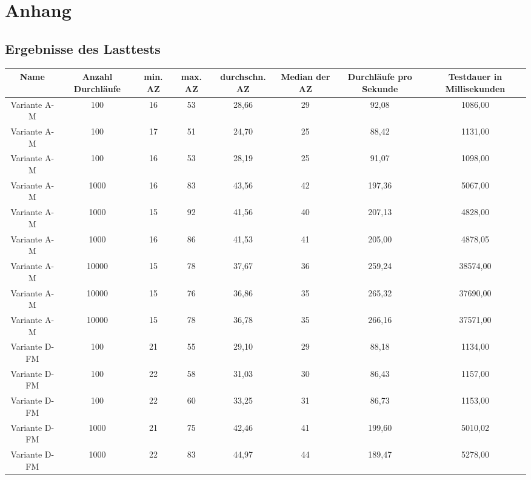 
\chapter{Anhang}

\section{Ergebnisse des Lasttests}


\begin{landscape}
\begin{table}[h!]
	\centering
	\small
	\begin{tabular}{ |c|c|c|c|c|c|c|c|} 
		\hline
		Name & Anzahl Durchläufe & min. AZ & max. AZ & durchschn. AZ & Median der AZ & Durchläufe pro Sekunde & Testdauer in Millisekunden \\ 
		\hline
		Variante A-M & 100 & 16 & 53 & 28,66 & 29 & 92,08 & 1086,00 \\
		\hline
		Variante A-M & 100 & 17 & 51 & 24,70 & 25 & 88,42 & 1131,00 \\
		\hline
		Variante A-M & 100 & 16 & 53 & 28,19 & 25 & 91,07 & 1098,00 \\
		\hline
		Variante A-M & 1000 & 16 & 83 & 43,56 & 42 & 197,36 & 5067,00 \\
		\hline
		Variante A-M & 1000 & 15 & 92 & 41,56 & 40 & 207,13 & 4828,00 \\
		\hline
		Variante A-M & 1000 & 16 & 86 & 41,53 & 41 & 205,00 & 4878,05 \\
		\hline
		Variante A-M & 10000 & 15 & 78 & 37,67 & 36 & 259,24 & 38574,00 \\
		\hline
		Variante A-M & 10000 & 15 & 76 & 36,86 & 35 & 265,32 & 37690,00 \\
		\hline
		Variante A-M & 10000 & 15 & 78 & 36,78 & 35 & 266,16 & 37571,00 \\
		\hline
		Variante D-FM & 100 & 21 & 55 & 29,10 & 29 & 88,18 & 1134,00 \\
		\hline
		Variante D-FM & 100 & 22 & 58 & 31,03 & 30 & 86,43 & 1157,00 \\
		\hline
		Variante D-FM & 100 & 22 & 60 & 33,25 & 31 & 86,73 & 1153,00 \\
		\hline
		Variante D-FM & 1000 & 21 & 75 & 42,46 & 41 & 199,60 & 5010,02 \\
		\hline
		Variante D-FM & 1000 & 22 & 83 & 44,97 & 44 & 189,47 & 5278,00 \\

\end{tabular}
\end{table}
\end{landscape}
